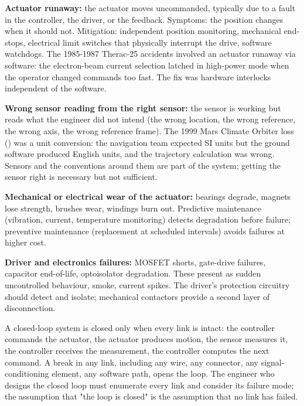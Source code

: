 \textbf{Actuator runaway:} the actuator moves uncommanded, typically due to a fault in the controller, the driver, or the feedback. Symptoms: the position changes when it should not. Mitigation: independent position monitoring, mechanical end-stops, electrical limit switches that physically interrupt the drive, software watchdogs. The 1985-1987 Therac-25 accidents involved an actuator runaway via software: the electron-beam current selection latched in high-power mode when the operator changed commands too fast. The fix was hardware interlocks independent of the software.

\textbf{Wrong sensor reading from the right sensor:} the sensor is working but reads what the engineer did not intend (the wrong location, the wrong reference, the wrong axis, the wrong reference frame). The 1999 Mars Climate Orbiter loss (\cite{acc:nasa-mco-mib}) was a unit conversion: the navigation team expected SI units but the ground software produced English units, and the trajectory calculation was wrong. Sensors and the conventions around them are part of the system; getting the sensor right is necessary but not sufficient.

\textbf{Mechanical or electrical wear of the actuator:} bearings degrade, magnets lose strength, brushes wear, windings burn out. Predictive maintenance (vibration, current, temperature monitoring) detects degradation before failure; preventive maintenance (replacement at scheduled intervals) avoids failures at higher cost.

\textbf{Driver and electronics failures:} MOSFET shorts, gate-drive failures, capacitor end-of-life, optoisolator degradation. These present as sudden uncontrolled behaviour, smoke, current spikes. The driver's protection circuitry should detect and isolate; mechanical contactors provide a second layer of disconnection.

\begin{principle}
A closed-loop system is closed only when every link is intact: the controller commands the actuator, the actuator produces motion, the sensor measures it, the controller receives the measurement, the controller computes the next command. A break in any link, including any wire, any connector, any signal-conditioning element, any software path, opens the loop. The engineer who designs the closed loop must enumerate every link and consider its failure mode; the assumption that "the loop is closed" is the assumption that no link has failed.
\end{principle}

